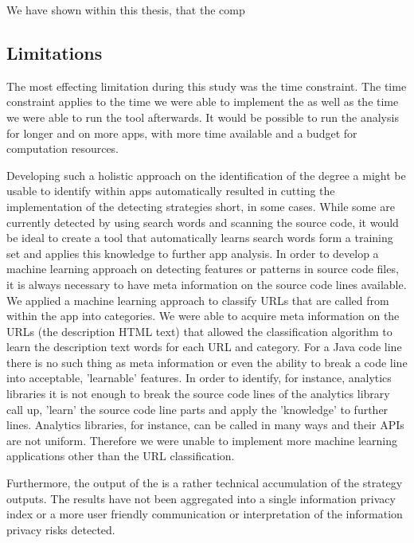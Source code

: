 We have shown within this thesis, that the comp

\subsection{Limitations}\label{chapter:Limitations}

The most effecting limitation during this study was the time constraint.
The time constraint applies to the time we were able to implement the \aiprat as well as the time we were able to run the tool afterwards.
It would be possible to run the analysis for longer and on more apps, with more time available and a budget for computation resources.

Developing such a holistic approach on the identification of the degree a \sca might be usable to identify \ipr within \mH apps automatically resulted in cutting the implementation of the \ipr detecting strategies short, in some cases.
While some \ipr are currently detected by using search words and scanning the source code, it would be ideal to create a tool that automatically learns search words form a training set and applies this knowledge to further app analysis.
In order to develop a machine learning approach on detecting features or patterns in source code files, it is always necessary to have meta information on the source code lines available.
We applied a machine learning approach to classify URLs that are called from within the app into categories. 
We were able to acquire meta information on the URLs (the description HTML text) that allowed the classification algorithm to learn the description text words for each URL and category.
For a Java code line there is no such thing as meta information or even the ability to break a code line into acceptable, 'learnable' features.
In order to identify, for instance, analytics libraries it is not enough to break the source code lines of the analytics library call up, 'learn' the source code line parts and apply the 'knowledge' to further lines.
Analytics libraries, for instance, can be called in many ways and their \acs{API}s are not uniform.
Therefore we were unable to implement more machine learning applications other than the URL classification.

Furthermore, the output of the \aiprat is a rather technical accumulation of the \sca strategy outputs.
The results have not been aggregated into a single information privacy index or a more user friendly communication or interpretation of the information privacy risks detected.

